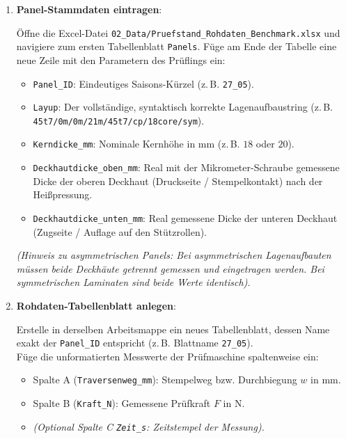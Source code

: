 \begin{enumerate}
    \item \textbf{Panel-Stammdaten eintragen}: \par
    Öffne die Excel-Datei \texttt{02\_Data/\allowbreak Pruefstand\_Rohdaten\_Benchmark.xlsx} und navigiere zum ersten Tabellenblatt \texttt{Panels}. Füge am Ende der Tabelle eine neue Zeile mit den Parametern des Prüflings ein:
    \begin{itemize}
        \item \texttt{Panel\_ID}: Eindeutiges Saisons-Kürzel (z.\,B. \texttt{27\_05}).
        \item \texttt{Layup}: Der vollständige, syntaktisch korrekte Lagenaufbaustring (z.\,B. \texttt{45t7/\allowbreak 0m/\allowbreak 0m/\allowbreak 21m/\allowbreak 45t7/\allowbreak cp/\allowbreak 18core/\allowbreak sym}).
        \item \texttt{Kerndicke\_mm}: Nominale Kernhöhe in $\text{mm}$ (z.\,B. $18$ oder $20$).
        \item \texttt{Deckhautdicke\_oben\_mm}: Real mit der Mikrometer-Schraube gemessene Dicke der oberen Deckhaut (Druckseite / Stempelkontakt) nach der Heißpressung.
        \item \texttt{Deckhautdicke\_unten\_mm}: Real gemessene Dicke der unteren Deckhaut (Zugseite / Auflage auf den Stützrollen).
    \end{itemize}
    \textit{(Hinweis zu asymmetrischen Panels: Bei asymmetrischen Lagenaufbauten müssen beide Deckhäute getrennt gemessen und eingetragen werden. Bei symmetrischen Laminaten sind beide Werte identisch).}

    \item \textbf{Rohdaten-Tabellenblatt anlegen}: \par
    Erstelle in derselben Arbeitsmappe ein neues Tabellenblatt, dessen Name exakt der \texttt{Panel\_ID} entspricht (z.\,B. Blattname \texttt{27\_05}). \\
    Füge die unformatierten Messwerte der Prüfmaschine spaltenweise ein:
    \begin{itemize}
        \item Spalte A (\texttt{Traversenweg\_mm}): Stempelweg bzw. Durchbiegung $w$ in $\text{mm}$.
        \item Spalte B (\texttt{Kraft\_N}): Gemessene Prüfkraft $F$ in $\text{N}$.
        \item \textit{(Optional Spalte C \texttt{Zeit\_s}: Zeitstempel der Messung).}
    \end{itemize}


\end{enumerate}
